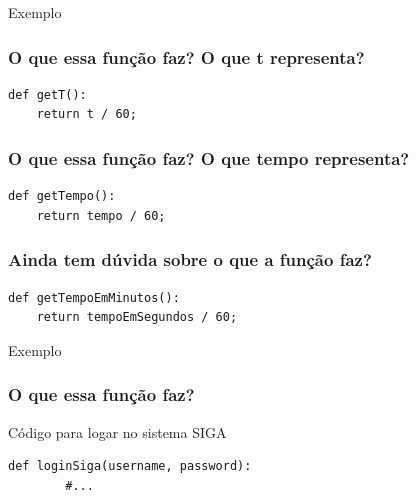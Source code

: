 \begin{frame}
	\Huge Exemplo
\end{frame}

\begin{frame}[fragile]
	\frametitle{O que essa função faz? O que t representa?}

	\begin{listing}[H]
		\begin{verbatim}
def getT():
	return t / 60;
		\end{verbatim}
	\end{listing}

\end{frame}

\begin{frame}[fragile]
	\frametitle{O que essa função faz? O que tempo representa?}

	\begin{listing}[H]
		\begin{verbatim}
def getTempo():
	return tempo / 60;
		\end{verbatim}
	\end{listing}

\end{frame}

\begin{frame}[fragile]
	\frametitle{Ainda tem dúvida sobre o que a função faz?}

	\begin{listing}[H]
		\begin{verbatim}
def getTempoEmMinutos():
	return tempoEmSegundos / 60;
		\end{verbatim}
	\end{listing}

\end{frame}

\begin{frame}
	\Huge Exemplo
\end{frame}

\begin{frame}[fragile]
	\frametitle{O que essa função faz?}

	\begin{listing}[H]
		\caption{Código para logar no sistema SIGA}
		\begin{verbatim}
def loginSiga(username, password):
		#...
		\end{verbatim}
	\end{listing}

\end{frame}

